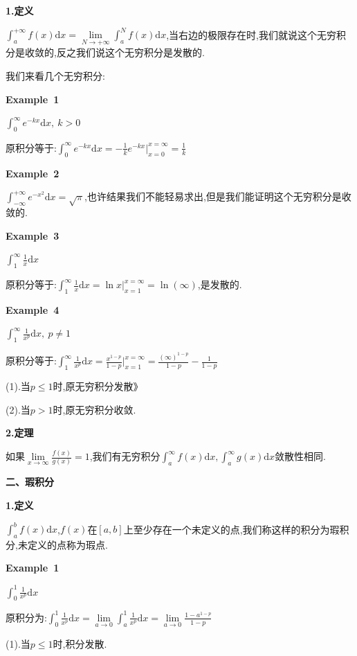 \documentclass[oneside]{book}
\begin{document}
	\centerline{\textbf{1.定义}}
	
	$\int_{a}^{+\infty}f(x)\mathrm{d}x=\lim\limits_{N\rightarrow +\infty}\int_{a}^{N}f(x)\mathrm{d}x$,当右边的极限存在时,我们就说这个无穷积分是收敛的,反之我们说这个无穷积分是发散的.
	
	我们来看几个无穷积分:
	
	\textbf{Example\ 1}
	
	$\int_{0}^{\infty}e^{-kx}\mathrm{d}x,\ k>0$
	
	原积分等于:$\int_{0}^{\infty}e^{-kx}\mathrm{d}x=-\frac{1}{k}e^{-kx}\big|_{x=0}^{x=\infty}=\frac{1}{k}$
	
	\textbf{Example\ 2}
	
	$\int_{-\infty}^{+\infty}e^{-x^{2}}\mathrm{d}x=\sqrt{\pi}$,也许结果我们不能轻易求出,但是我们能证明这个无穷积分是收敛的.
	
	\textbf{Example\ 3}
	
	$\int_{1}^{\infty}\frac{1}{x}\mathrm{d}x$
	
	原积分等于:$\int_{1}^{\infty}\frac{1}{x}\mathrm{d}x=\ln x\big|_{x=1}^{x=\infty}=\ln(\infty)$,是发散的.
	
	\textbf{Example\ 4}
	
	$\int_{1}^{\infty}\frac{1}{x^{p}}\mathrm{d}x,\ p\neq1$
	
	原积分等于:$\int_{1}^{\infty}\frac{1}{x^{p}}\mathrm{d}x=\frac{x^{1-p}}{1-p}\big|_{x=1}^{x=\infty}=\frac{(\infty)^{1-p}}{1-p}-\frac{1}{1-p}$
	
	(1).当$p\leq 1$时,原无穷积分发散》
	
	(2).当$p>1$时,原无穷积分收敛.
	
	\centerline{\textbf{2.定理}}
	
	如果$\lim\limits_{x\rightarrow \infty}\frac{f(x)}{g(x)}=1$,我们有无穷积分$\int_{a}^{\infty}f(x)\mathrm{d}x,\int_{a}^{\infty}g(x)\mathrm{d}x$敛散性相同.
	
	\textbf{二、瑕积分}
	
	\centerline{\textbf{1.定义}}
	
	$\int_{a}^{b}f(x)\mathrm{d}x$,$f(x)$在$[a,b]$上至少存在一个未定义的点,我们称这样的积分为瑕积分,未定义的点称为瑕点.
	
	\textbf{Example\ 1}
	
	$\int_{0}^{1}\frac{1}{x^{p}}\mathrm{d}x$
	
	原积分为:$\int_{0}^{1}\frac{1}{x^{p}}\mathrm{d}x=\lim\limits_{a\rightarrow 0}\int_{a}^{1}\frac{1}{x^{p}}\mathrm{d}x=\lim\limits_{a\rightarrow 0}\frac{1-a^{1-p}}{1-p}$
	
	(1).当$p\leq 1$时,积分发散.
	
\end{document}
